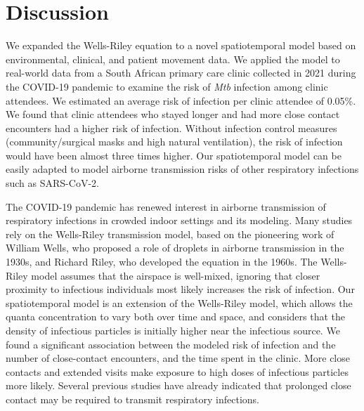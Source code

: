 \documentclass[fleqn,11pt]{wlscirep}
\begin{document}
\FloatBarrier

\newpage

\section*{Discussion}

We expanded the Wells-Riley equation to a novel spatiotemporal model based on environmental, clinical, and patient movement data. We applied the model to real-world data from a South African primary care clinic collected in 2021 during the COVID-19 pandemic to examine the risk of \emph{Mtb} infection among clinic attendees. We estimated an average risk of infection per clinic attendee of 0.05\%. We found that clinic attendees who stayed longer and had more close contact encounters had a higher risk of infection. Without infection control measures (community/surgical masks and high natural ventilation), the risk of infection would have been almost three times higher. Our spatiotemporal model can be easily adapted to model airborne transmission risks of other respiratory infections such as SARS-CoV-2.

The COVID-19 pandemic has renewed interest in airborne transmission of respiratory infections in crowded indoor settings\cite{Wang2021Science,Morawska2021,Greenhalgh2022BMJ} and its modeling\cite{Shen2021STBE,Buonanno2020EI,Edwards2024RiskAnalysis}. Many studies\cite{Andrews2014JID,Taylor2016IJTLD,Hella2017JInfect,Zemouri2020JDR} rely on the Wells-Riley transmission model\cite{Riley1961Book}, based on the pioneering work of William Wells, who proposed a role of droplets in airborne transmission in the 1930s\cite{Wells1934AJE}, and Richard Riley, who developed the equation in the 1960s\cite{Riley1961Book}.  The Wells-Riley model assumes that the airspace is well-mixed, ignoring that closer proximity to infectious individuals most likely increases the risk of infection. Our spatiotemporal model is an extension of the Wells-Riley model, which allows the quanta concentration to vary both over time and space, and considers that the density of infectious particles is initially higher near the infectious source\cite{Wang2021Science,Vuorinen2020SafSci,Chen2020BuildEnv}. We found a significant association between the modeled risk of infection and the number of close-contact encounters, and the time spent in the clinic. More close contacts and extended visits make exposure to high doses of infectious particles more likely. Several previous studies have already indicated that prolonged close contact may be required to transmit respiratory infections\cite{Leung2020NatMed,Brankston2007LancetID,Narasimhan2013PulmonaryMed}. 
\end{document}
